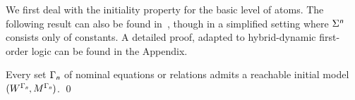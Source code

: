 \documentclass[a4paper,UKenglish,cleveref,autoref]{lipics-v2019}
\begin{document}
We first deal with the initiality property for the basic level of atoms.
The following result can also be found in~\cite{Gaina17Her}, though in a simplified setting where \(\Sigma^{\text{\normalfont\sffamily\itshape n}}\) consists only of constants.
A detailed proof, adapted to hybrid-dynamic first-order logic can be found in the Appendix.

\begin{proposition}
  \label{proposition:HDCLSn-initiality}
  Every set\/ \(\Gamma_{\text{\normalfont\sffamily\itshape n}}\) of nominal equations or relations admits a reachable initial model \((W^{\Gamma_{\text{\normalfont\sffamily\itshape n}}}, M^{\Gamma_{\text{\normalfont\sffamily\itshape n}}})\).
  \qed
\end{proposition}



\end{document}
